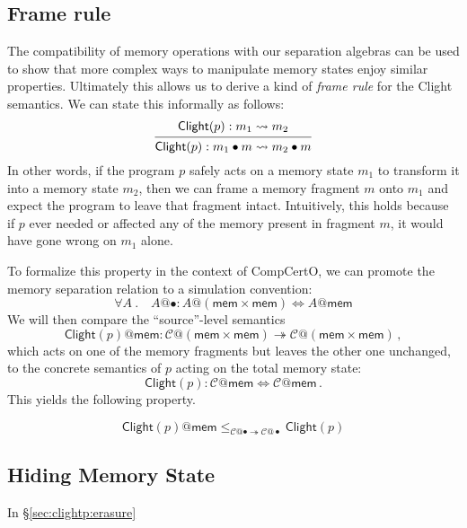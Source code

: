 \documentclass[acmsmall,screen,review,anonymous]{acmart}
\newcommand{\kw}[1]{\ensuremath{ \mathsf{#1} }}
\begin{document}

\subsection{Frame rule} %

The compatibility of memory operations with our separation algebras
can be used to show that
more complex ways to manipulate memory states
enjoy similar properties.
Ultimately this allows us to derive
a kind of \emph{frame rule} for the Clight semantics.
We can state this informally as follows:
\[
  \begin{prooftree}
    \hypo{\kw{Clight}(p) : m_1 \leadsto m_2}
    \infer1{\kw{Clight}(p) : m_1 \bullet m \leadsto m_2 \bullet m}
  \end{prooftree}
\]
In other words,
if the program $p$ safely acts on a memory state $m_1$
to transform it into a memory state $m_2$,
then we can frame a memory fragment $m$ onto $m_1$
and expect the program to leave that fragment intact.
Intuitively, this holds because
if $p$ ever needed or affected any of the memory present
in fragment $m$,
it would have gone wrong on $m_1$ alone.

To formalize this property in the context of CompCertO,
we can promote the memory separation relation
to a simulation convention:
\[
  \forall A \:.\quad
  A@{\bullet} : A@(\kw{mem} \times \kw{mem}) \Leftrightarrow A@\kw{mem}
\]
We will then compare the ``source''-level semantics
\[
  \kw{Clight}(p)@\kw{mem} :
    \mathcal{C}@(\kw{mem} \times \kw{mem}) \twoheadrightarrow
    \mathcal{C}@(\kw{mem} \times \kw{mem})
  \,,
\]
which acts on one of the memory fragments
but leaves the other one unchanged,
to the concrete semantics of $p$ acting on the total memory state:
\[
  \kw{Clight}(p) : \mathcal{C}@\kw{mem} \Leftrightarrow \mathcal{C}@\kw{mem}
  \,.
\]
This yields the following property.

\begin{lemma}
\[
  \kw{Clight}(p)@\kw{mem}
  \le_{\mathcal{C}@{\bullet} \twoheadrightarrow \mathcal{C}@{\bullet}}
  \kw{Clight}(p)
\]
\end{lemma}


\subsection{Hiding Memory State} %

In \S\ref{sec:clightp:erasure}
\end{document}
